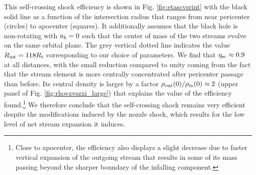 \documentclass[a4paper,fleqn,usenatbib]{mnras}
\newcommand{\rt}{R_{\rm t}}
\newcommand{\rint}{R_{\rm int}}
\begin{document}
This self-crossing shock efficiency is shown in Fig. \ref{fig:etascvsrint} with the black solid line as a function of the intersection radius  that ranges from near pericenter (circles) to apocenter (squares). It additionally assumes that the black hole is non-rotating with $a_{\rm h} =0$ such that the center of mass of the two streams evolve on the same orbital plane. The grey vertical dotted line indicates the value $\rint = 118 \rt$ corresponding to our choice of parameters. We find that $\eta_{\rm sc} \approx 0.9$ at all distances, with the small reduction compared to unity coming from the fact that the stream element is more centrally concentrated after pericenter passage than before. Its central density is larger by a factor $\rho_{\rm out}(0)/\rho_{\rm in}(0) \approx 2$ (upper panel of Fig. \ref{fig:rhovzvszxi_large}) that explains the value of the efficiency found.\footnote{Close to apocenter, the efficiency also displays a slight decrease due to faster vertical expansion of the outgoing stream that results in some of its mass passing beyond the sharper boundary of the infalling component.} We therefore conclude that the self-crossing shock remains very efficient despite the modifications induced by the nozzle shock, which results for the low level of net stream expansion it induces.
\end{document}
